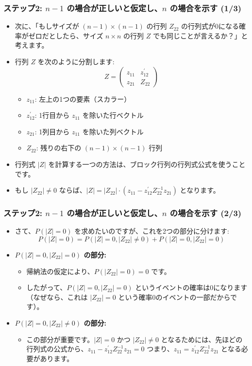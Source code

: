 \documentclass[aspectratio=169]{beamer}
\begin{document}
\begin{frame}
\frametitle{ステップ2: $n-1$ の場合が正しいと仮定し、$n$ の場合を示す (1/3)}
\begin{itemize}
    \item 次に、「もしサイズが $(n-1)\times(n-1)$ の行列 $Z_{22}$ の行列式が0になる確率がゼロだとしたら、サイズ $n\times n$ の行列 $Z$ でも同じことが言えるか？」と考えます。
    \item 行列 $Z$ を次のように分割します:
    \[ Z=\begin{pmatrix}z_{11}&z_{12}^{\prime}\\ z_{21}&Z_{22}\end{pmatrix} \]
    \begin{itemize}
        \item $z_{11}$: 左上の1つの要素（スカラー）
        \item $z_{12}^{\prime}$: 1行目から $z_{11}$ を除いた行ベクトル
        \item $z_{21}$: 1列目から $z_{11}$ を除いた列ベクトル
        \item $Z_{22}$: 残りの右下の $(n-1)\times(n-1)$ 行列
    \end{itemize}
    \item 行列式 $|Z|$ を計算する一つの方法は、ブロック行列の行列式公式を使うことです。
    \item もし $|Z_{22}|\ne0$ ならば、$|Z|=|Z_{22}|\cdot(z_{11}-z_{12}^{\prime}Z_{22}^{-1}z_{21})$ となります。
\end{itemize}
\end{frame}

\begin{frame}
\frametitle{ステップ2: $n-1$ の場合が正しいと仮定し、$n$ の場合を示す (2/3)}
\begin{itemize}
    \item さて、$P(|Z|=0)$ を求めたいのですが、これを2つの部分に分けます:
    \[ P(|Z|=0)=P(|Z|=0,|Z_{22}|\ne0)+P(|Z|=0,|Z_{22}|=0) \]
    \item \textbf{$P(|Z|=0,|Z_{22}|=0)$ の部分:}
    \begin{itemize}
        \item 帰納法の仮定により、$P(|Z_{22}|=0)=0$ です。
        \item したがって、$P(|Z|=0,|Z_{22}|=0)$ というイベントの確率は0になります（なぜなら、これは $|Z_{22}|=0$ という確率0のイベントの一部だからです）。
    \end{itemize}
    \item \textbf{$P(|Z|=0,|Z_{22}|\ne0)$ の部分:}
    \begin{itemize}
        \item この部分が重要です。$|Z|=0$ かつ $|Z_{22}|\ne0$ となるためには、先ほどの行列式の公式から、$z_{11}-z_{12}^{\prime}Z_{22}^{-1}z_{21}=0$ つまり、$z_{11}=z_{12}^{\prime}Z_{22}^{-1}z_{21}$ となる必要があります。
    \end{itemize}
\end{itemize}
\end{frame}
\end{document}
